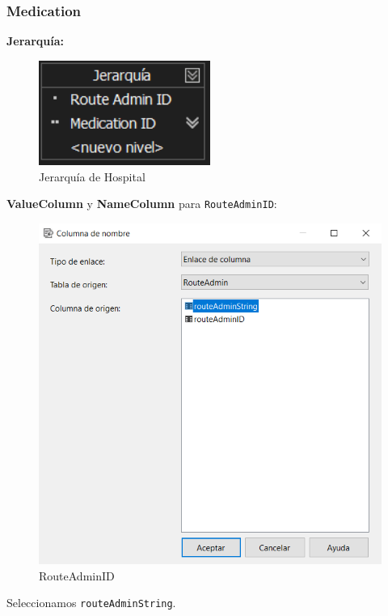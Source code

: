 \documentclass[12pt, a4paper, twoside]{article}
\begin{document}
\subsubsection{Medication}

\textbf{Jerarquía:}

\begin{figure}[H]
	\centering
	\includegraphics[width=0.5\textwidth]{image/JMedication}
	\caption{Jerarquía de Hospital}
	\label{fig:22}
\end{figure}

\textbf{ValueColumn} y \textbf{NameColumn} para \texttt{RouteAdminID}:

\begin{figure}[H]
	\centering
	\includegraphics[width=1\textwidth]{image/routeAdmin}
	\caption{RouteAdminID}
	\label{fig:23}
\end{figure}

Seleccionamos \texttt{routeAdminString}.
\end{document}
